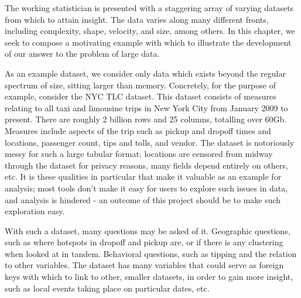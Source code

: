 The working statistician is presented with a staggering array of varying
datasets from which to attain insight. The data varies along many
different fronts, including complexity, shape, velocity, and size, among
others. In this chapter, we seek to compose a motivating example with
which to illustrate the development of our answer to the problem of
large data.

As an example dataset, we consider only data which exists beyond the
regular spectrum of size, sitting larger than memory. Concretely, for
the purpose of example, consider the NYC TLC dataset. This dataset
consists of measures relating to all taxi and limousine trips in New
York City from January 2009 to present. There are roughly 2 billion rows
and 25 columns, totalling over 60Gb. Measures include aspects of the
trip such as pickup and dropoff times and locations, passenger count,
tips and tolls, and vendor. The dataset is notoriously messy for such a
large tabular format; locations are censored from midway through the
dataset for privacy reasons, many fields depend entirely on others, etc.
It is these qualities in particular that make it valuable as an example
for analysis; most tools don't make it easy for users to explore such
issues in data, and analysis is hindered - an outcome of this project
should be to make such exploration easy.

With such a dataset, many questions may be asked of it. Geographic
questions, such as where hotspots in dropoff and pickup are, or if there
is any clustering when looked at in tandem. Behavioral questions, such
as tipping and the relation to other variables. The dataset has many
variables that could serve as foreign keys with which to link to other,
smaller datasets, in order to gain more insight, such as local events
taking place on particular dates, etc.

